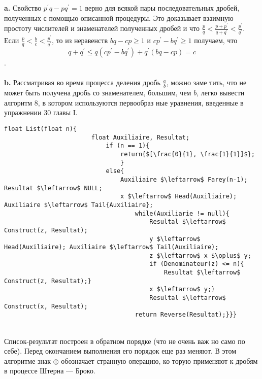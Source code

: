 \documentclass{../../template/mai_book}
\begin{document}
\hspace*{15pt}\textbf{a.}  Свойство $p^{'}q - pq^{'} = 1$ верно для всякой пары последовательных\linebreak
дробей, полученных с помощью описанной процедуры. Это доказывает\linebreak
взаимную простоту числителей и знаменателей полученных дробей и\linebreak
что $\frac{p}{q} < \frac{p + p^{'}}{q + q^{'}} < \frac{p^{'}}{q^{'}}$.\\

\hspace*{0pt}Если $\frac{p}{q} < \frac{b}{c} < \frac{p^{'}}{q^{'}}$, то из неравенств $bq - cp \geq 1$ и $cp^{'} - bq^{'} \geq 1$ получаем,\linebreak
что
$$q + q^{'} \leq q(cp^{'} - bq^{'}) + q^{'}(bq - cp) = c$$.\\
\\
\hspace*{15pt}\textbf{b.} Рассматривая во время процесса деления дробь $\frac{a}{b}$, можно заме­\linebreak
тить, что не может быть получена дробь со знаменателем, большим,\linebreak
чем $b$,  легко вывести алгоритм 8, в котором используются первообраз­\linebreak
ные уравнения, введенные в упражнении 30 главы I.\\

			\begin{lstlisting}[mathescape = true, caption = {Прохождение ряда Фарея}]
					float List(float n){
						float Auxiliaire, Resultat;
							if (n == 1){
								return{$[\frac{0}{1}, \frac{1}{1}]$};
								}
							else{
								Auxiliaire $\leftarrow$ Farey(n-1); Resultat $\leftarrow$ NULL;
								x $\leftarrow$ Head(Auxiliaire); Auxiliaire $\leftarrow$ Tail{Auxiliaire};
									while(Auxiliarie != null){
										Resultal $\leftarrow$ Construct(z, Resultat);
										у $\leftarrow$ Head(Auxiliaire); Auxiliaire $\leftarrow$ Tail(Auxiliaire);
										z $\leftarrow$ x $\oplus$ y;
										if (Denominateur(z) <= n){
											Resultat $\leftarrow$ Construct(z, Resultat);}
										x $\leftarrow$ y;}
										Resultal $\leftarrow$ Construct(x, Resultat);
									return Reverse(Resultat);}}}
			\end{lstlisting}
\\
\hspace*{15pt} Список-результат построен в обратном порядке (что не очень важ­\linebreak
но само по себе). Перед окончанием выполнения его порядок еще раз\linebreak 
меняют. В этом алгоритме знак $\oplus$  обозначает странную операцию, ко­\linebreak
торую применяют к дробям в процессе Штерна — Броко.\\
\newpage
\end{document}
